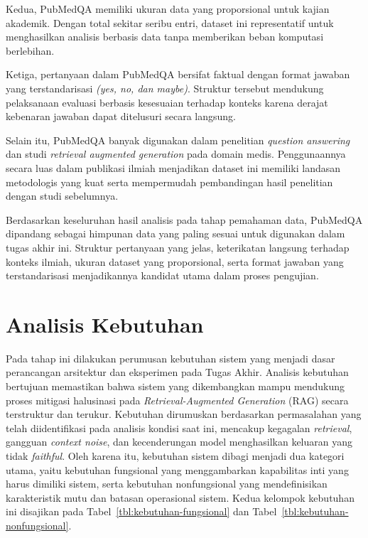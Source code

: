 Kedua, PubMedQA memiliki ukuran data yang proporsional untuk kajian akademik. Dengan total sekitar seribu entri, dataset ini representatif untuk menghasilkan analisis berbasis data tanpa memberikan beban komputasi berlebihan.

Ketiga, pertanyaan dalam PubMedQA bersifat faktual dengan format jawaban yang terstandarisasi \textit{(yes, no, dan maybe)}. Struktur tersebut mendukung pelaksanaan evaluasi berbasis kesesuaian terhadap konteks karena derajat kebenaran jawaban dapat ditelusuri secara langsung.

Selain itu, PubMedQA banyak digunakan dalam penelitian \textit{question answering} dan studi \textit{retrieval augmented generation} pada domain medis. Penggunaannya secara luas dalam publikasi ilmiah menjadikan dataset ini memiliki landasan metodologis yang kuat serta mempermudah pembandingan hasil penelitian dengan studi sebelumnya.

Berdasarkan keseluruhan hasil analisis pada tahap pemahaman data, PubMedQA dipandang sebagai himpunan data yang paling sesuai untuk digunakan dalam tugas akhir ini. Struktur pertanyaan yang jelas, keterikatan langsung terhadap konteks ilmiah, ukuran dataset yang proporsional, serta format jawaban yang terstandarisasi menjadikannya kandidat utama dalam proses pengujian.


\section{Analisis Kebutuhan}
\label{sec:analisis-kebutuhan}

Pada tahap ini dilakukan perumusan kebutuhan sistem yang menjadi dasar perancangan arsitektur dan eksperimen pada Tugas Akhir. Analisis kebutuhan bertujuan memastikan bahwa sistem yang dikembangkan mampu mendukung proses mitigasi halusinasi pada \textit{Retrieval-Augmented Generation} (RAG) secara terstruktur dan terukur. Kebutuhan dirumuskan berdasarkan permasalahan yang telah diidentifikasi pada analisis kondisi saat ini, mencakup kegagalan \textit{retrieval}, gangguan \textit{context noise}, dan kecenderungan model menghasilkan keluaran yang tidak \textit{faithful}. Oleh karena itu, kebutuhan sistem dibagi menjadi dua kategori utama, yaitu kebutuhan fungsional yang menggambarkan kapabilitas inti yang harus dimiliki sistem, serta kebutuhan nonfungsional yang mendefinisikan karakteristik mutu dan batasan operasional sistem. Kedua kelompok kebutuhan ini disajikan pada Tabel~\ref{tbl:kebutuhan-fungsional} dan Tabel~\ref{tbl:kebutuhan-nonfungsional}.

